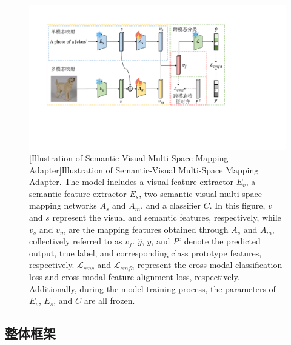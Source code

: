 \begin{figure}[h!]
  \centering
  \includegraphics[width=1.0\columnwidth]{figures/SVMSMA/model.pdf}
  [Illustration of Semantic-Visual Multi-Space Mapping Adapter]{Illustration of Semantic-Visual Multi-Space Mapping Adapter. The model includes a visual feature extractor $E_v$, a semantic feature extractor $E_s$, two semantic-visual multi-space mapping networks $A_s$ and $A_m$, and a classifier $C$. In this figure, $v$ and $s$ represent the visual and semantic features, respectively, while $v_s$ and $v_m$ are the mapping features obtained through $A_s$ and $A_m$, collectively referred to as $v_f$. $\widehat{y}$, $y$, and $P^c$ denote the predicted output, true label, and corresponding class prototype features, respectively. $\mathcal{L}_{cmc}$ and $\mathcal{L}_{cmfa}$ represent the cross-modal classification loss and cross-modal feature alignment loss, respectively. Additionally, during the model training process, the parameters of $E_v$, $E_s$, and $C$ are all frozen.}
  \label{figure4: model}
\end{figure}

\subsection[\hspace{-2pt}整体框架]{{\heiti{} \hspace{-8pt}整体框架}}\label{section4: 整体框架}


